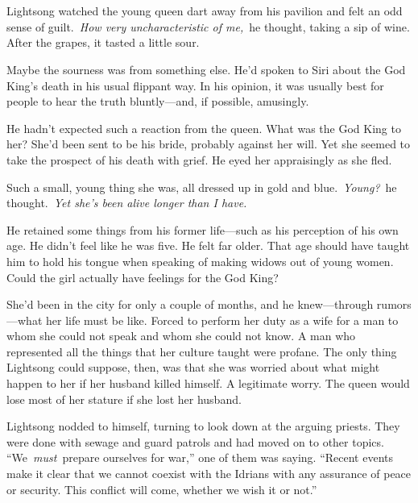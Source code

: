 \chapter{}

Lightsong watched the young queen dart away from his pavilion and felt an odd sense of guilt.~\textit{How very uncharacteristic of me,}~he thought, taking a sip of wine. After the grapes, it tasted a little sour.

Maybe the sourness was from something else. He’d spoken to Siri about the God King’s death in his usual flippant way. In his opinion, it was usually best for people to hear the truth bluntly—and, if possible, amusingly.

He hadn’t expected such a reaction from the queen. What was the God King to her? She’d been sent to be his bride, probably against her will. Yet she seemed to take the prospect of his death with grief. He eyed her appraisingly as she fled.

Such a small, young thing she was, all dressed up in gold and blue.~\textit{Young?}~he thought.~\textit{Yet she’s been alive longer than I have.}

He retained some things from his former life—such as his perception of his own age. He didn’t feel like he was five. He felt far older. That age should have taught him to hold his tongue when speaking of making widows out of young women. Could the girl actually have feelings for the God King?

She’d been in the city for only a couple of months, and he knew—through rumors—what her life must be like. Forced to perform her duty as a wife for a man to whom she could not speak and whom she could not know. A man who represented all the things that her culture taught were profane. The only thing Lightsong could suppose, then, was that she was worried about what might happen to her if her husband killed himself. A legitimate worry. The queen would lose most of her stature if she lost her husband.

Lightsong nodded to himself, turning to look down at the arguing priests. They were done with sewage and guard patrols and had moved on to other topics. “We~\textit{must}~prepare ourselves for war,” one of them was saying. “Recent events make it clear that we cannot coexist with the Idrians with any assurance of peace or security. This conflict will come, whether we wish it or not.”

